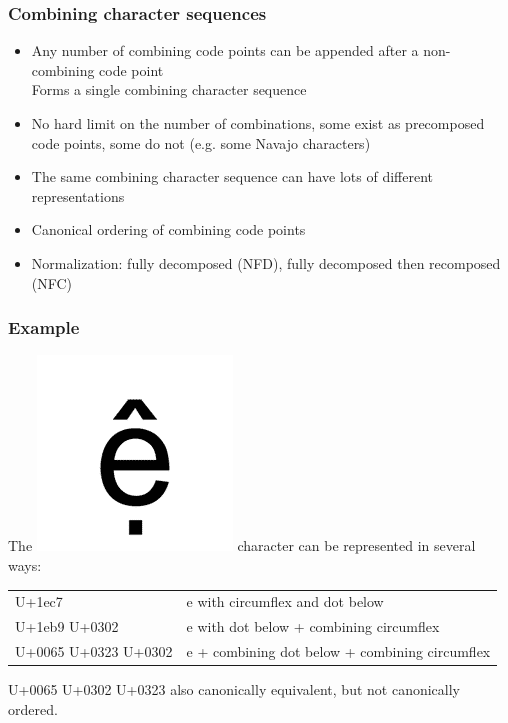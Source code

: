 \documentclass{beamer}
\begin{document}
\begin{frame}
	\frametitle{Combining character sequences}
	
	\begin{itemize}
		\item Any number of combining code points can be appended after a non-combining code point\\
		      Forms a single combining character sequence
		\item No hard limit on the number of combinations, some exist as precomposed code points, some do not (e.g. some Navajo characters)
		\item The same combining character sequence can have lots of different representations
	\end{itemize}
	
	\begin{itemize}
		\item Canonical ordering of combining code points
		\item Normalization: fully decomposed (NFD), fully decomposed then recomposed (NFC)
	\end{itemize}
	
\end{frame}

\begin{frame}
	\frametitle{Example}
	
	The \includegraphics[scale=0.07]{1EC7.png} character can be represented in several ways:
	
	\bigskip
	\small{
	\begin{tabular}{ll}
	U+1ec7 & e with circumflex and dot below\\
	U+1eb9 U+0302 & e with dot below + combining circumflex\\ 
	U+0065 U+0323 U+0302 & e + combining dot below + combining circumflex
	\end{tabular} }
	\bigskip
	
	U+0065 U+0302 U+0323 also canonically equivalent, but not canonically ordered.
	\bigskip
\end{frame}
\end{document}
